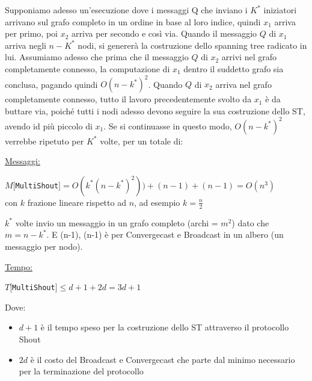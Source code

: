 Supponiamo adesso un'esecuzione dove i messaggi Q che inviano i $K^*$ iniziatori
arrivano sul grafo completo in un ordine in base al loro indice, quindi $x_1$
arriva per primo, poi $x_2$ arriva per secondo e così via. Quando il messaggio
$Q$ di $x_1$ arriva negli $n-K^*$ nodi, si genererà la costruzione dello
spanning tree radicato in lui. Assumiamo adesso che prima che il messaggio $Q$
di $x_2$ arrivi nel grafo completamente connesso, la computazione di $x_1$
dentro il suddetto grafo sia conclusa, pagando quindi $O(n-k^*)^2$. Quando $Q$
di $x_2$ arriva nel grafo completamente connesso, tutto il lavoro
precedentemente svolto da $x_1$ è da buttare via, poiché tutti i nodi adesso
devono seguire la sua costruzione dello ST, avendo id più piccolo di $x_1$. Se
si continuasse in questo modo, $O(n-k^*)^2$ verrebbe ripetuto per $K^*$ volte,
per un totale di:


\underline{Messaggi:}
\begin{center}
    $M[$\texttt{MultiShout}$] = O(k^*(n-k^*)^2)) + (n-1)+ (n-1) = O(n^3)$\\
    con $k$ frazione lineare rispetto ad $n$, ad esempio $k=\frac{n}{2}$
\end{center}
$k^*$ volte invio un messaggio in un grafo completo (archi = $m^2$) dato che
$m=n-k^*$. E (n-1), (n-1) è per Convergecast e Broadcast in un albero (un
messaggio per nodo).

\underline{Tempo:}
\begin{center}
    $T[$\texttt{MultiShout}$] \leq d + 1 + 2d = 3d + 1$
\end{center}
Dove:
\begin{itemize}
    \item  $d+1$ è il tempo speso per la costruzione dello ST attraverso il
          protocollo Shout
    \item $2d$ è il costo del Broadcast e Convergecast che parte dal minimo
          necessario per la terminazione del protocollo
\end{itemize}

